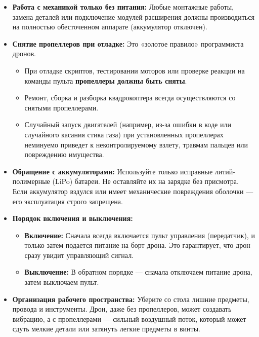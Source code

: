 \begin{itemize}
    \item \textbf{Работа с механикой только без питания:} Любые монтажные работы, замена деталей или подключение модулей расширения должны производиться на полностью обесточенном аппарате (аккумулятор отключен).
    
    \item \textbf{Снятие пропеллеров при отладке:} Это «золотое правило» программиста дронов.
    \begin{itemize}
        \item При отладке скриптов, тестировании моторов или проверке реакции на команды пульта \textbf{пропеллеры должны быть сняты}.
        \item Ремонт, сборка и разборка квадрокоптера всегда осуществляются со снятыми пропеллерами.
        \item Случайный запуск двигателей (например, из-за ошибки в коде или случайного касания стика газа) при установленных пропеллерах неминуемо приведет к неконтролируемому взлету, травмам пальцев или повреждению имущества.
    \end{itemize}

    \item \textbf{Обращение с аккумуляторами:} Используйте только исправные литий-полимерные (LiPo) батареи. Не оставляйте их на зарядке без присмотра. Если аккумулятор вздулся или имеет механические повреждения оболочки — его эксплуатация строго запрещена.

    \item \textbf{Порядок включения и выключения:}
    \begin{itemize}
        \item \textbf{Включение:} Сначала всегда включается пульт управления (передатчик), и только затем подается питание на борт дрона. Это гарантирует, что дрон сразу увидит управляющий сигнал.
        \item \textbf{Выключение:} В обратном порядке — сначала отключаем питание дрона, затем выключаем пульт.
    \end{itemize}

    \item \textbf{Организация рабочего пространства:} Уберите со стола лишние предметы, провода и инструменты. Дрон, даже без пропеллеров, может создавать вибрацию, а с пропеллерами — сильный воздушный поток, который может сдуть мелкие детали или затянуть легкие предметы в винты.
\end{itemize}

